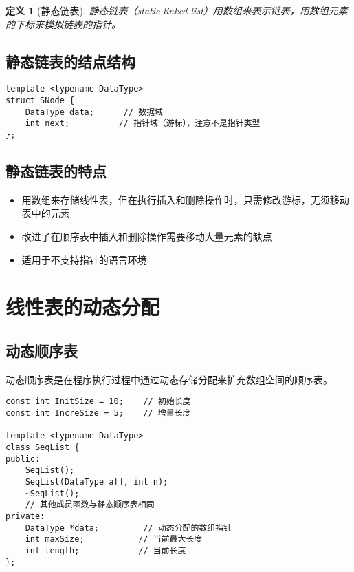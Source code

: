 \documentclass[12pt,a4paper]{amsart}
\newtheorem{definition}{定义}[section]
\begin{document}
\begin{definition}[静态链表]
静态链表（static linked list）用数组来表示链表，用数组元素的下标来模拟链表的指针。
\end{definition}

\subsection{静态链表的结点结构}

\indent

\begin{lstlisting}[caption=静态链表结点定义]
template <typename DataType>
struct SNode {
    DataType data;      // 数据域
    int next;          // 指针域（游标），注意不是指针类型
};
\end{lstlisting}

\subsection{静态链表的特点}

\begin{itemize}
\item 用数组来存储线性表，但在执行插入和删除操作时，只需修改游标，无须移动表中的元素
\item 改进了在顺序表中插入和删除操作需要移动大量元素的缺点
\item 适用于不支持指针的语言环境
\end{itemize}

\section{线性表的动态分配}

\subsection{动态顺序表}

动态顺序表是在程序执行过程中通过动态存储分配来扩充数组空间的顺序表。

\begin{lstlisting}[caption=动态顺序表类定义]
const int InitSize = 10;    // 初始长度
const int IncreSize = 5;    // 增量长度

template <typename DataType>
class SeqList {
public:
    SeqList();
    SeqList(DataType a[], int n);
    ~SeqList();
    // 其他成员函数与静态顺序表相同
private:
    DataType *data;         // 动态分配的数组指针
    int maxSize;           // 当前最大长度
    int length;            // 当前长度
};
\end{lstlisting}
\end{document}
